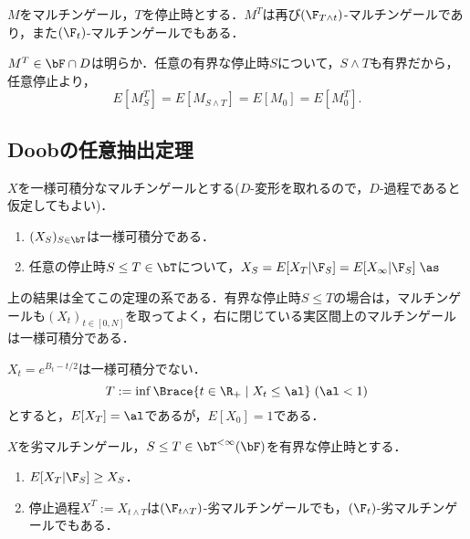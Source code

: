 \documentclass[uplatex,dvipdfmx]{jsreport}
\begin{document}
\begin{corollary}
    $M$をマルチンゲール，$T$を停止時とする．$M^T$は再び$(\F_{T\land t})$-マルチンゲールであり，また$(\F_t)$-マルチンゲールでもある．
\end{corollary}
\begin{Proof}
    $M^T\in\bF\cap D$は明らか．任意の有界な停止時$S$について，$S\land T$も有界だから，任意停止より，
    \[E[M_S^T]=E[M_{S\land T}]=E[M_0]=E[M_0^T].\]
\end{Proof}

\subsection{Doobの任意抽出定理}

\begin{theorem}[任意抽出定理]
    $X$を一様可積分なマルチンゲールとする($D$-変形を取れるので，$D$-過程であると仮定してもよい)．
    \begin{enumerate}
        \item $(X_S)_{S\in\bT}$は一様可積分である．
        \item 任意の停止時$S\le T\in\bT$について，$X_S=E[X_T|\F_S]=E[X_\infty|\F_S]\;\as$
    \end{enumerate}
\end{theorem}
\begin{remarks}[有界な停止時の場合]
    上の結果は全てこの定理の系である．有界な停止時$S\le T$の場合は，マルチンゲールも$(X_t)_{t\in[0,N]}$を取ってよく，右に閉じている実区間上のマルチンゲールは一様可積分である．
\end{remarks}


\begin{example}[一様可積分でないマルチンゲールは任意停止に違反する]
    $X_t=e^{B_t-t/2}$は一様可積分でない．
    \[T:=\inf\Brace{t\in\R_+\mid X_t\le\al}\;(\al<1)\]
    とすると，$E[X_T]=\al$であるが，$E[X_0]=1$である．
\end{example}

\begin{corollary}
    $X$を劣マルチンゲール，$S\le T\in\bT^{<\infty}(\bF)$を有界な停止時とする．
    \begin{enumerate}
        \item $E[X_T|\F_S]\ge X_S$．
        \item 停止過程$X^T:=X_{t\land T}$は$(\F_{t\land T})$-劣マルチンゲールでも，$(\F_t)$-劣マルチンゲールでもある．
    \end{enumerate}
\end{corollary}
\end{document}
